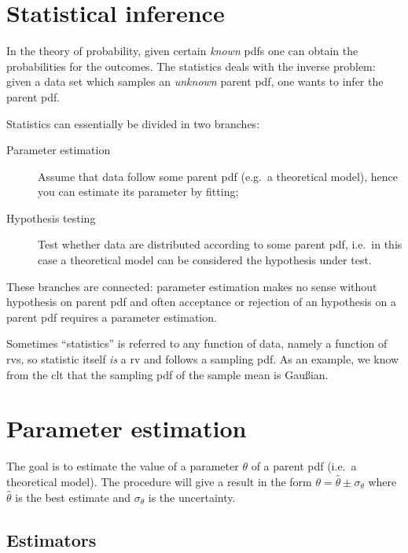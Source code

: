 \documentclass[
	10pt,
	draft
]{scrreprt}
\begin{document}
		\section{Statistical inference}

In the theory of probability, given certain \emph{known} \acp{pdf} one can obtain the probabilities for the outcomes.
The statistics deals with the inverse problem: given a data set which samples an \emph{unknown} parent \ac{pdf}, one wants to infer the parent \ac{pdf}.


Statistics can essentially be divided in two branches:
\begin{description}
	\item[Parameter estimation]
Assume that data follow some parent \ac{pdf} (e.g.~a theoretical model), hence you can estimate its parameter by fitting;

	\item[Hypothesis testing]
Test whether data are distributed according to some parent \ac{pdf}, i.e.~in this case a theoretical model can be considered the hypothesis under test.
\end{description}
These branches are connected:
parameter estimation makes no sense without hypothesis on parent \ac{pdf} and often acceptance or rejection of an hypothesis on a parent \ac{pdf} requires a parameter estimation.


Sometimes ``statistics'' is referred to any function of data, namely a function of \acp{rv}, so statistic itself \emph{is} a \ac{rv} and follows a sampling \ac{pdf}.
As an example, we know from the \ac{clt} that the sampling \ac{pdf} of the sample mean is Gau\ss{}ian.

	\section{Parameter estimation}

The goal is to estimate the value of a parameter $\theta$ of a parent \ac{pdf} (i.e.~a theoretical model).
The procedure will give a result in the form $\theta = \hat\theta \pm \sigma_\theta$ where $\hat\theta$ is the best estimate and $\sigma_\theta$ is the uncertainty.


		\subsection{Estimators}
\end{document}
